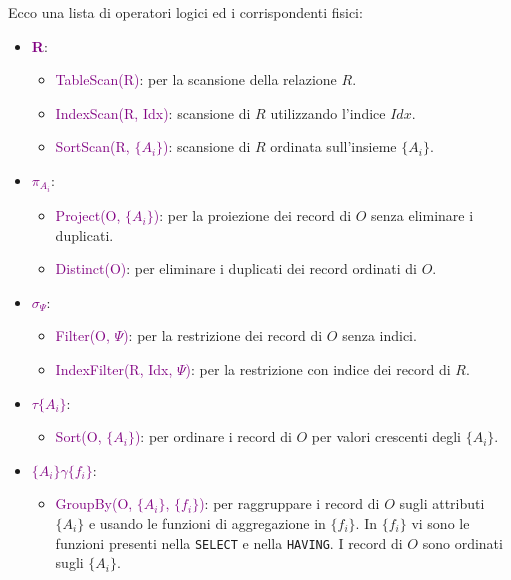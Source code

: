 Ecco una lista di operatori logici ed i corrispondenti fisici:
\begin{itemize}
    \item \textbf{\textcolor{purple}{R}}:
        \begin{itemize}
            \item \textcolor{purple}{TableScan(R)}: per la scansione della relazione $R$.
            \item \textcolor{purple}{IndexScan(R, Idx)}: scansione di $R$ utilizzando l'indice $Idx$.
            \item \textcolor{purple}{SortScan(R, $\{A_i\}$)}: scansione di $R$ ordinata sull'insieme $\{A_i\}$.
        \end{itemize}
    \item \textbf{\textcolor{purple}{$\pi_{A_i}$}}:
        \begin{itemize}
            \item \textcolor{purple}{Project(O, $\{A_i\}$)}: per la proiezione dei record di $O$ senza eliminare i duplicati.
            \item \textcolor{purple}{Distinct(O)}: per eliminare i duplicati dei record ordinati di $O$.
        \end{itemize}
    \item \textbf{\textcolor{purple}{$\sigma_{\Psi}$}}:
        \begin{itemize}
            \item \textcolor{purple}{Filter(O, $\Psi$)}: per la restrizione dei record di $O$ senza indici.
            \item \textcolor{purple}{IndexFilter(R, Idx, $\Psi$)}: per la restrizione con indice dei record di $R$.
        \end{itemize}
    \item \textbf{\textcolor{purple}{$\tau{\{A_i\}}$}}:
        \begin{itemize}
            \item \textcolor{purple}{Sort(O, $\{A_i\}$)}: per ordinare i record di $O$ per valori crescenti degli $\{A_i\}$.
        \end{itemize}
    \item \textbf{\textcolor{purple}{$\{A_i\}\gamma\{f_i\}$}}:
        \begin{itemize}
            \item \textcolor{purple}{GroupBy(O, $\{A_i\}$, $\{f_i\}$)}: per raggruppare i record di $O$ sugli attributi
                $\{A_i\}$ e usando le funzioni di aggregazione in $\{f_i\}$. In $\{f_i\}$ vi sono le funzioni presenti
                nella \verb|SELECT| e nella \verb|HAVING|. I record di $O$ sono ordinati sugli $\{A_i\}$.
        \end{itemize}
\end{itemize}